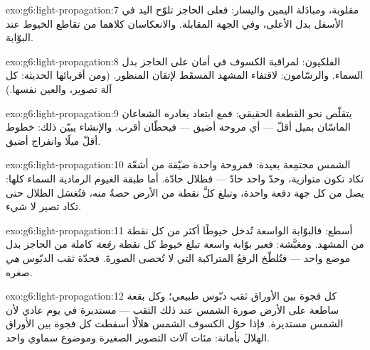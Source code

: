 \begin{solution}{exo:g6:light-propagation:7}
مقلوبة، ومبادَلة اليمين واليسار: فعلى الحاجز تلوّح اليد في
الأسفل بدل الأعلى، وفي الجهة المقابلة. والانعكاسان كلاهما من
تقاطع الخيوط عند البوّابة.
\end{solution}

\begin{solution}{exo:g6:light-propagation:8}
الفلكيون: لمراقبة الكسوف في أمان على الحاجز بدل السماء.
والرسّامون: لاقتفاء المشهد المسقَط لإتقان المنظور. (ومن أقربائها
الحديثة: كل آلة تصوير، والعين نفسها.)
\end{solution}

\begin{solution}{exo:g6:light-propagation:9}
يتقلّص  نحو  القطعة الحقيقي: فمع ابتعاد  يغادره
الشعاعان الماسّان بميل أقلّ --- أي مروحة أضيق --- فيحطّان
أقرب. والإنشاء يبيّن ذلك: خطوط أقلّ ميلًا وانفراج أضيق.
\end{solution}

\begin{solution}{exo:g6:light-propagation:10}
الشمس مجتمِعة بعيدة: فمروحة واحدة ضيّقة من أشعّة تكاد تكون
متوازية، وحدّ واحد حادّ --- فظلال حادّة. أما طبقة الغيوم
الرمادية   السماء كلها: يصل  من كل جهة دفعة
واحدة، وتبلغ كلَّ نقطة من الأرض حصةٌ منه، فتُغسَل الظلال حتى
تكاد تصير لا شيء.
\end{solution}

\begin{solution}{exo:g6:light-propagation:11}
أسطع: فالبوّابة الواسعة تُدخل خيوطًا أكثر من كل نقطة من المشهد.
ومغبَّشة: فعبر بوّابة واسعة تبلغ خيوط كل نقطة \emph{رقعة}
كاملة من الحاجز بدل موضع واحد --- فتُلطّخ الرقعُ المتراكبة التي
لا تُحصى الصورةَ. فحدّة ثقب الدبّوس \emph{هي} صغره.
\end{solution}

\begin{solution}{exo:g6:light-propagation:12}
كل فجوة بين الأوراق ثقب دبّوس طبيعي؛ وكل بقعة ساطعة على الأرض
صورة الشمس عند ذلك الثقب --- مستديرة في يوم عادي لأن الشمس
مستديرة. فإذا حوّل الكسوف الشمس هلالًا أسقطت كل فجوة بين
الأوراق الهلالَ بأمانة: مئات آلات التصوير الصغيرة وموضوع سماوي
واحد.
\end{solution}

